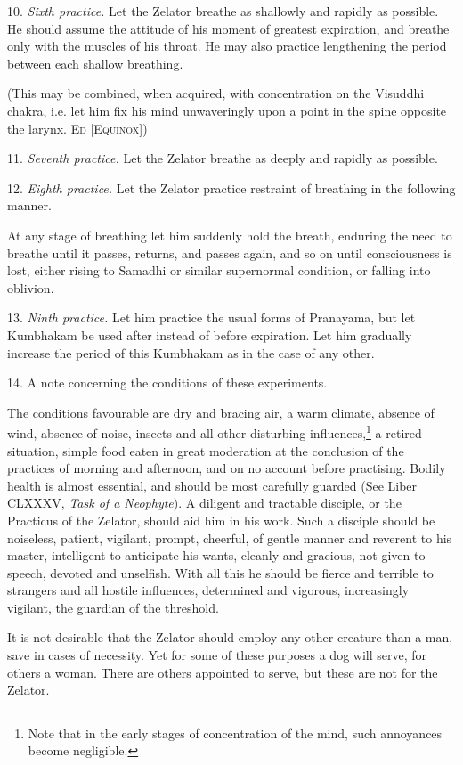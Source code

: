 10. \textit{Sixth practice.} Let the Zelator breathe as shallowly and rapidly as possible. He should assume the attitude of his moment of greatest expiration, and breathe only with the muscles of his throat. He may also practice lengthening the period between each shallow breathing.

(This may be combined, when acquired, with concentration on the Visuddhi chakra, i.e. let him fix his mind unwaveringly upon a point in the spine opposite the larynx. \textsc{Ed [Equinox]})

11. \textit{Seventh practice.} Let the Zelator breathe as deeply and rapidly as possible.

12. \textit{Eighth practice.} Let the Zelator practice restraint of breathing in the following manner.

At any stage of breathing let him suddenly hold the breath, enduring the need to breathe until it passes, returns, and passes again, and so on until consciousness is lost, either rising to Samadhi or similar supernormal condition, or falling into oblivion.

13. \textit{Ninth practice.} Let him practice the usual forms of Pranayama, but let Kumbhakam be used after instead of before expiration. Let him gradually increase the period of this Kumbhakam as in the case of any other.

14. A note concerning the conditions of these experiments.

The conditions favourable are dry and bracing air, a warm climate, absence of wind, absence of noise, insects and all other disturbing influences,\footnote{Note that in the early stages of concentration of the mind, such annoyances become negligible.} a retired situation, simple food eaten in great moderation at the conclusion of the practices of morning and afternoon, and on no account before practising. Bodily health is almost essential, and should be most carefully guarded (See Liber CLXXXV, \textit{Task of a Neophyte}). A diligent and tractable disciple, or the Practicus of the Zelator, should aid him in his work. Such a disciple should be noiseless, patient, vigilant, prompt, cheerful, of gentle manner and reverent to his master, intelligent to anticipate his wants, cleanly and gracious, not given to speech, devoted and unselfish. With all this he should be fierce and terrible to strangers and all hostile influences, determined and vigorous, increasingly vigilant, the guardian of the threshold.

It is not desirable that the Zelator should employ any other creature than a man, save in cases of necessity. Yet for some of these purposes a dog will serve, for others a woman. There are others appointed to serve, but these are not for the Zelator.

